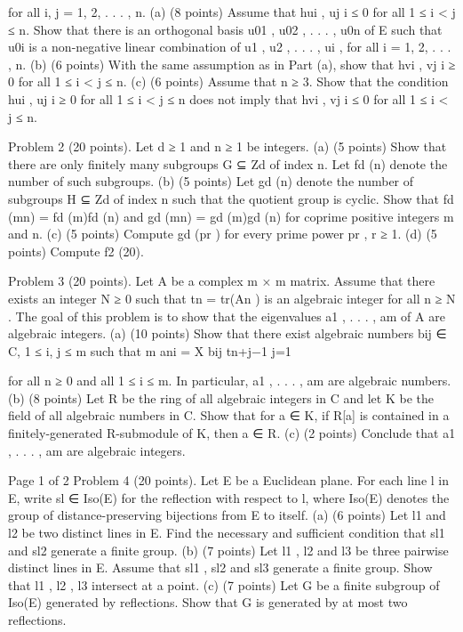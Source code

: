 \documentclass[UTF8,12pt]{ctexart}
\begin{document}
for all i, j = 1, 2, . . . , n. (a) (8 points) Assume that hui , uj i ≤ 0 for all 1 ≤ i < j ≤ n. Show that there is an orthogonal basis u01 , u02 , . . . , u0n of E such that u0i is a non-negative linear combination of u1 , u2 , . . . , ui , for all i = 1, 2, . . . , n. (b) (6 points) With the same assumption as in Part (a), show that hvi , vj i ≥ 0 for all 1 ≤ i < j ≤ n. (c) (6 points) Assume that n ≥ 3. Show that the condition hui , uj i ≥ 0 for all 1 ≤ i < j ≤ n does not imply that hvi , vj i ≤ 0 for all 1 ≤ i < j ≤ n.

Problem 2 (20 points). Let d ≥ 1 and n ≥ 1 be integers. (a) (5 points) Show that there are only finitely many subgroups G ⊆ Zd of index n. Let fd (n) denote the number of such subgroups. (b) (5 points) Let gd (n) denote the number of subgroups H ⊆ Zd of index n such that the quotient group is cyclic. Show that fd (mn) = fd (m)fd (n) and gd (mn) = gd (m)gd (n) for coprime positive integers m and n. (c) (5 points) Compute gd (pr ) for every prime power pr , r ≥ 1. (d) (5 points) Compute f2 (20).

Problem 3 (20 points). Let A be a complex m × m matrix. Assume that there exists an integer N ≥ 0 such that tn = tr(An ) is an algebraic integer for all n ≥ N . The goal of this problem is to show that the eigenvalues a1 , . . . , am of A are algebraic integers. (a) (10 points) Show that there exist algebraic numbers bij ∈ C, 1 ≤ i, j ≤ m such that m ani = X bij tn+j−1 j=1

for all n ≥ 0 and all 1 ≤ i ≤ m. In particular, a1 , . . . , am are algebraic numbers. (b) (8 points) Let R be the ring of all algebraic integers in C and let K be the field of all algebraic numbers in C. Show that for a ∈ K, if R[a] is contained in a finitely-generated R-submodule of K, then a ∈ R. (c) (2 points) Conclude that a1 , . . . , am are algebraic integers.

Page 1 of 2 Problem 4 (20 points). Let E be a Euclidean plane. For each line l in E, write sl ∈ Iso(E) for the reflection with respect to l, where Iso(E) denotes the group of distance-preserving bijections from E to itself. (a) (6 points) Let l1 and l2 be two distinct lines in E. Find the necessary and sufficient condition that sl1 and sl2 generate a finite group. (b) (7 points) Let l1 , l2 and l3 be three pairwise distinct lines in E. Assume that sl1 , sl2 and sl3 generate a finite group. Show that l1 , l2 , l3 intersect at a point. (c) (7 points) Let G be a finite subgroup of Iso(E) generated by reflections. Show that G is generated by at most two reflections.
\end{document}
